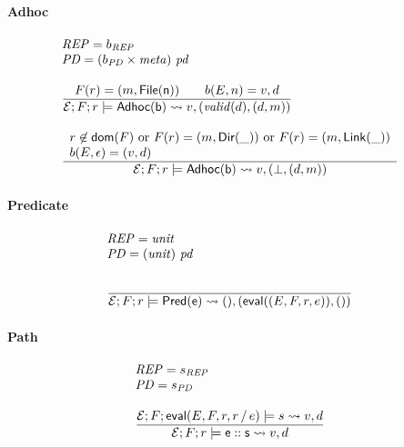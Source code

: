 \documentclass[nocopyrightspace,natbib]{sigplanconf}
\begin{document}


\paragraph*{Adhoc}
\[
\begin{array}{l}
\REP = b_\REP\\
\PD = \pd{b_\PD \times \meta}\\
\\
\infrule
{ F(r) = (m,\File{n}) \qquad 
  b(E,n) = v,d }
{ \Env;F;r \models \SAdhoc{b} \yields v,(\valid{d},(d,m)) }
{ }\\
\\
\infrule
{ \begin{array}{l}
  r \not\in \dom{F} \text{ or } F(r) = (m,\Dir{\_}) \text{ or } F(r) = (m,\Link{\_}) \\
  b(E,\epsilon) = (v,d)
  \end{array} }
{ \Env;F;r \models \SAdhoc{b} \yields v,(\bot,(d,m)) }
{}
\end{array}
\]

\paragraph*{Predicate}
\[
\begin{array}{l}
\REP = \typ{unit}\\
\PD = \pd{\typ{unit}}\\
\\
\infrule
{ }
{ \Env;F;r \models \SPred{e} \yields (),(\eval{(E,F,r,e)},()) }
{ }
\end{array}
\]

\paragraph*{Path}
\[
\begin{array}{l}
\REP = s_\REP\\
\PD = s_\PD\\
\\
\infrule
{ \Env;F;\eval{E,F,r,\PCons{r}{e}} \models s \yields v,d }
{ \Env;F;r \models \SPath{e}{s} \yields v,d }
{ }
\end{array}
\]
\end{document}
